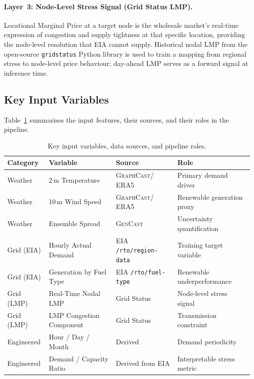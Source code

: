\documentclass[10pt,letterpaper]{article}
\newcommand{\graphcast}{\textsc{GraphCast}\xspace}
\newcommand{\gencast}{\textsc{GenCast}\xspace}
\begin{document}
\paragraph{Layer~3: Node-Level Stress Signal (Grid Status LMP).}
Locational Marginal Price at a target node is the wholesale market's real-time expression of
congestion and supply tightness at that specific location, providing the node-level resolution
that EIA cannot supply. Historical nodal LMP from the open-source \texttt{gridstatus} Python
library is used to train a mapping from regional stress to node-level price behaviour; day-ahead
LMP serves as a forward signal at inference time.

\subsection{Key Input Variables}

Table~\ref{tab:inputs} summarises the input features, their sources, and their roles in the
pipeline.

\begin{table}[H]
\centering
\caption{Key input variables, data sources, and pipeline roles.}
\label{tab:inputs}
\renewcommand{\arraystretch}{1.25}
\begin{tabularx}{\linewidth}{@{}lllX@{}}
\toprule
\textbf{Category} & \textbf{Variable} & \textbf{Source} & \textbf{Role} \\
\midrule
Weather & 2\,m Temperature & \graphcast / ERA5 & Primary demand driver \\
Weather & 10\,m Wind Speed & \graphcast / ERA5 & Renewable generation proxy \\
Weather & Ensemble Spread & \gencast & Uncertainty quantification \\
\midrule
Grid (EIA) & Hourly Actual Demand & EIA \texttt{/rto/region-data} & Training target variable \\
Grid (EIA) & Generation by Fuel Type & EIA \texttt{/rto/fuel-type} & Renewable underperformance \\
\midrule
Grid (LMP) & Real-Time Nodal LMP & Grid Status & Node-level stress signal \\
Grid (LMP) & LMP Congestion Component & Grid Status & Transmission constraint \\
\midrule
Engineered & Hour / Day / Month & Derived & Demand periodicity \\
Engineered & Demand / Capacity Ratio & Derived from EIA & Interpretable stress metric \\
\bottomrule
\end{tabularx}
\end{table}
\end{document}
